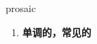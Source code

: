 
\begin{frame}
{\huge prosaic}
\begin{center}
\begin{enumerate}\Large
  \item \textbf{单调的，常见的}
\end{enumerate}
\end{center}
\end{frame}
